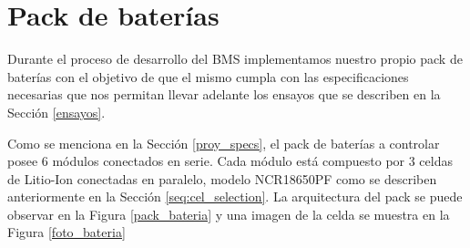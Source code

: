 \documentclass[10pt, a4paper]{report}
\begin{document}
\section{Pack de bater\'ias}\label{Section_battery_pack}

Durante el proceso de desarrollo del \acrshort{BMS} implementamos nuestro propio
pack de baterías con el objetivo de que el mismo cumpla con las especificaciones
necesarias que nos permitan llevar adelante los ensayos que se describen en la
Sección \ref{ensayos}.

Como se menciona en la Secci\'on \ref{proy_specs}, el pack de bater\'ias a
controlar posee 6 m\'odulos conectados en serie. Cada módulo est\'a compuesto
por 3 celdas de Litio-Ion conectadas en paralelo, modelo NCR18650PF como se describen
anteriormente en la Sección \ref{seq:cel_selection}. La arquitectura del pack se
puede observar en la Figura \ref{pack_bateria} y una imagen de la celda se
muestra en la Figura \ref{foto_bateria}
\end{document}
